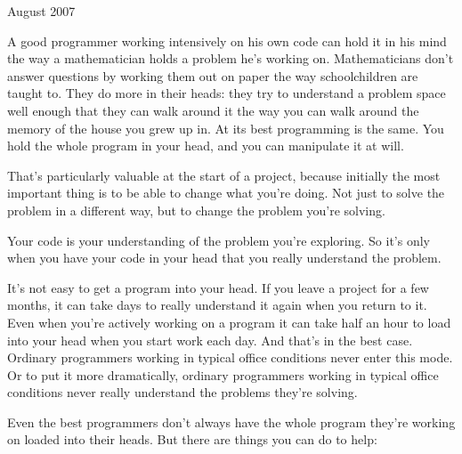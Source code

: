 August 2007

A good programmer working intensively on his own code can hold it in his
mind the way a mathematician holds a problem he's working on.
Mathematicians don't answer questions by working them out on paper the
way schoolchildren are taught to. They do more in their heads: they try
to understand a problem space well enough that they can walk around it
the way you can walk around the memory of the house you grew up in. At
its best programming is the same. You hold the whole program in your
head, and you can manipulate it at will.

That's particularly valuable at the start of a project, because
initially the most important thing is to be able to change what you're
doing. Not just to solve the problem in a different way, but to change
the problem you're solving.

Your code is your understanding of the problem you're exploring. So it's
only when you have your code in your head that you really understand the
problem.

It's not easy to get a program into your head. If you leave a project
for a few months, it can take days to really understand it again when
you return to it. Even when you're actively working on a program it can
take half an hour to load into your head when you start work each day.
And that's in the best case. Ordinary programmers working in typical
office conditions never enter this mode. Or to put it more dramatically,
ordinary programmers working in typical office conditions never really
understand the problems they're solving.

Even the best programmers don't always have the whole program they're
working on loaded into their heads. But there are things you can do to
help:

